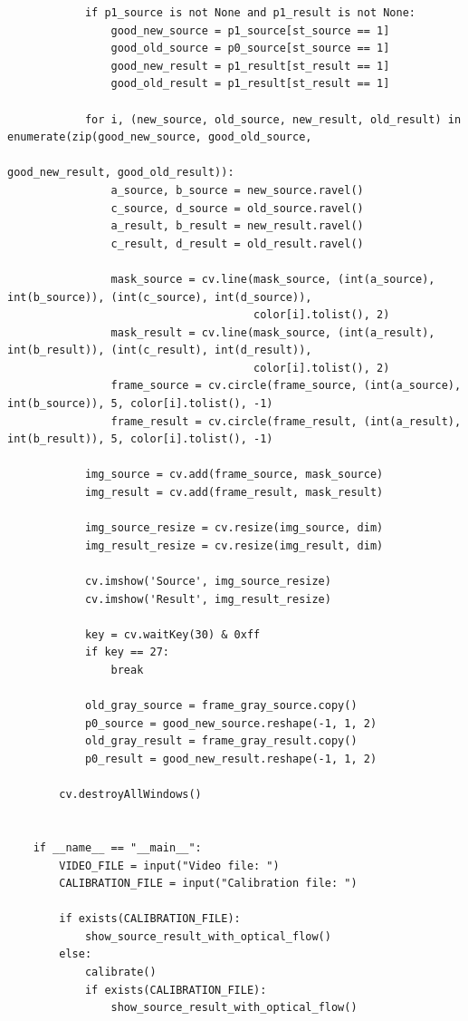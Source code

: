 \documentclass[a4paper,12pt]{article}
\begin{document}
\begin{lstlisting}
			if p1_source is not None and p1_result is not None:
				good_new_source = p1_source[st_source == 1]
				good_old_source = p0_source[st_source == 1]
				good_new_result = p1_result[st_result == 1]
				good_old_result = p1_result[st_result == 1]
	
			for i, (new_source, old_source, new_result, old_result) in enumerate(zip(good_new_source, good_old_source,
																					 good_new_result, good_old_result)):
				a_source, b_source = new_source.ravel()
				c_source, d_source = old_source.ravel()
				a_result, b_result = new_result.ravel()
				c_result, d_result = old_result.ravel()
	
				mask_source = cv.line(mask_source, (int(a_source), int(b_source)), (int(c_source), int(d_source)),
									  color[i].tolist(), 2)
				mask_result = cv.line(mask_source, (int(a_result), int(b_result)), (int(c_result), int(d_result)),
									  color[i].tolist(), 2)
				frame_source = cv.circle(frame_source, (int(a_source), int(b_source)), 5, color[i].tolist(), -1)
				frame_result = cv.circle(frame_result, (int(a_result), int(b_result)), 5, color[i].tolist(), -1)
	
			img_source = cv.add(frame_source, mask_source)
			img_result = cv.add(frame_result, mask_result)
	
			img_source_resize = cv.resize(img_source, dim)
			img_result_resize = cv.resize(img_result, dim)
	
			cv.imshow('Source', img_source_resize)
			cv.imshow('Result', img_result_resize)
	
			key = cv.waitKey(30) & 0xff
			if key == 27:
				break
	
			old_gray_source = frame_gray_source.copy()
			p0_source = good_new_source.reshape(-1, 1, 2)
			old_gray_result = frame_gray_result.copy()
			p0_result = good_new_result.reshape(-1, 1, 2)
	
		cv.destroyAllWindows()
	
	
	if __name__ == "__main__":
		VIDEO_FILE = input("Video file: ")
		CALIBRATION_FILE = input("Calibration file: ")
	
		if exists(CALIBRATION_FILE):
			show_source_result_with_optical_flow()
		else:
			calibrate()
			if exists(CALIBRATION_FILE):
				show_source_result_with_optical_flow()
	
\end{lstlisting}
\end{document}
